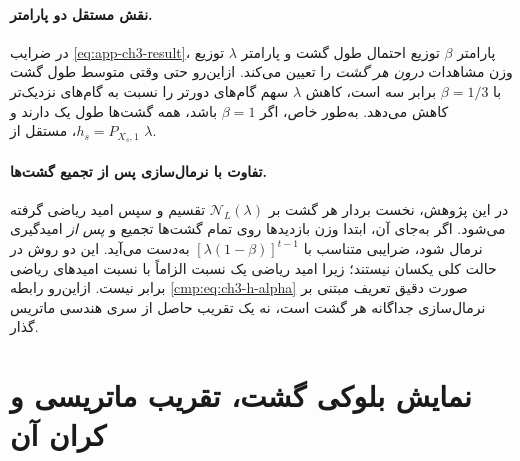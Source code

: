 \paragraph{نقش مستقل دو پارامتر.}
در ضرایب \eqref{eq:app-ch3-result}، پارامتر $\beta$ توزیع احتمال طول گشت و پارامتر $\lambda$ توزیع وزن مشاهدات \emph{درون هر گشت} را تعیین می‌کند. ازاین‌رو حتی وقتی متوسط طول گشت با $\beta=1/3$ برابر سه است، کاهش $\lambda$ سهم گام‌های دورتر را نسبت به گام‌های نزدیک‌تر کاهش می‌دهد. به‌طور خاص، اگر $\beta=1$ باشد، همه گشت‌ها طول یک دارند و $h_s=P_{X_s,1}$، مستقل از $\lambda$.

\paragraph{تفاوت با نرمال‌سازی پس از تجمیع گشت‌ها.}
در این پژوهش، نخست بردار هر گشت بر $\mathcal N_L(\lambda)$ تقسیم و سپس امید ریاضی گرفته می‌شود. اگر به‌جای آن، ابتدا وزن بازدیدها روی تمام گشت‌ها تجمیع و \emph{پس از} امیدگیری نرمال شود، ضرایبی متناسب با $[\lambda(1-\beta)]^{t-1}$ به‌دست می‌آید. این دو روش در حالت کلی یکسان نیستند؛ زیرا امید ریاضی یک نسبت الزاماً با نسبت امیدهای ریاضی برابر نیست. ازاین‌رو رابطه \eqref{cmp:eq:ch3-h-alpha} صورت دقیق تعریف مبتنی بر نرمال‌سازی جداگانه هر گشت است، نه یک تقریب حاصل از سری هندسی ماتریس گذار.



\section{نمایش بلوکی گشت، تقریب ماتریسی و کران آن}
\label{app:ch3-matrix-walk-proofs}


